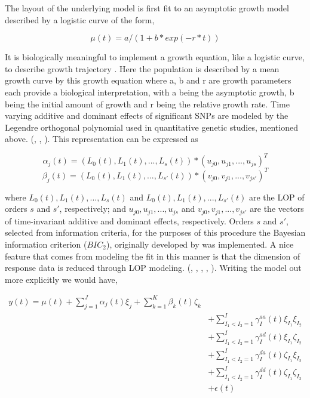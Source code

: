 \documentclass[11pt,]{book}
\theoremstyle{definition}
\theoremstyle{definition}
\theoremstyle{remark}
\begin{document}
The layout of the underlying model is first fit to an asymptotic growth
model described by a logistic curve of the form,

\[\mu(t) = a/(1 + b * exp(-r*t))\]

It is biologically meaningful to implement a growth equation, like a
logistic curve, to describe growth trajectory \cite{west2001general}.
Here the population is described by a mean growth curve by this growth
equation where a, b and r are growth parameters each provide a
biological interpretation, with a being the asymptotic growth, b being
the initial amount of growth and r being the relative growth rate. Time
varying additive and dominant effects of significant SNPs are modeled by
the Legendre orthogonal polynomial used in quantitative genetic studies,
mentioned above. (\cite{jiang20152higwas}, \cite{olori1999estimating},
\cite{li2010functional}). This representation can be expressed as

\[ \alpha_j(t) = (L_0(t), L_1(t), ... , L_s(t))*(u_{j0}, u_{j1},...,u_{js})^T \]
\[ \beta_j(t) = (L_0(t), L_1(t), ... , L_{s'}(t))*(v_{j0}, v_{j1},...,v_{js'})^T \]

where \(L_0(t), L_1(t), ... , L_s(t)\) and
\(L_0(t), L_1(t), ... , L_{s'}(t)\) are the LOP of orders \(s\) and
\(s'\), respectively; and \(u_{j0}, u_{j1},...,u_{js}\) and
\(v_{j0}, v_{j1},...,v_{js'}\) are the vectors of time-invariant
additive and dominant effects, respectively. Orders \(s\) and \(s'\),
selected from information criteria, for the purposes of this procedure
the Bayesian information criterion (\(BIC_2\)), originally developed by
\cite{chen2008extended} was implemented. A nice feature that comes from
modeling the fit in this manner is that the dimension of response data
is reduced through LOP modeling. (\cite{li2010functional},
\cite{jiang20152higwas}, \cite{li2010functional},
\cite{ahn2010functional}, \cite{das2011dynamic}). Writing the model out
more explicitly we would have,

\begin{equation}
\begin{split}
y(t) = \mu(t) + \sum_{j=1}^{J}\alpha_j(t)\xi_j + \sum_{k=1}^{K}\beta_k(t)\zeta_k \\ 
&+ \sum_{I_1<I_2=1}^{I}\gamma_I^{aa}(t) \xi_{I_1}\xi_{I_2} \\ 
&+ \sum_{I_1<I_2=1}^{I}\gamma_I^{ad}(t) \xi_{I_1}\zeta_{I_2} \\
&+ \sum_{I_1<I_2=1}^{I} \gamma_I^{da}(t) \zeta_{I_1}\xi_{I_2} \\
&+ \sum_{I_1<I_2=1}^{I} \gamma_I^{dd}(t)\zeta_{I_1}\zeta_{I_2} \\ 
&+ \epsilon(t)
\end{split}
\label{eq:epi-legendre}
\end{equation}
\end{document}
